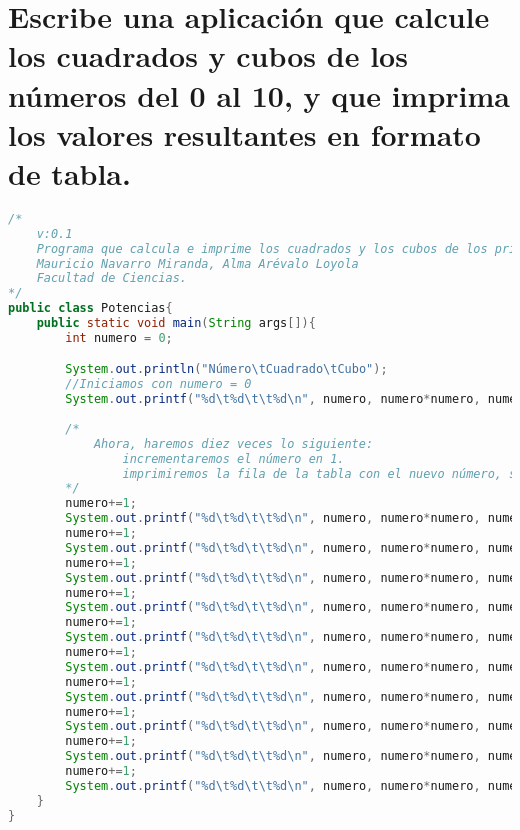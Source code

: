 \documentclass[a4paper]{article}
\begin{document}
\section{Escribe una aplicación que calcule los cuadrados y cubos de los números del 0 al 10, y que imprima los valores resultantes en formato de tabla.}
\begin{lstlisting}[language=JAVA]
/*
    v:0.1
    Programa que calcula e imprime los cuadrados y los cubos de los primeros once naturales.
    Mauricio Navarro Miranda, Alma Arévalo Loyola
    Facultad de Ciencias.
*/
public class Potencias{
    public static void main(String args[]){
        int numero = 0;

        System.out.println("Número\tCuadrado\tCubo");
        //Iniciamos con numero = 0
        System.out.printf("%d\t%d\t\t%d\n", numero, numero*numero, numero*numero*numero);
        
        /*
            Ahora, haremos diez veces lo siguiente:
                incrementaremos el número en 1.
                imprimiremos la fila de la tabla con el nuevo número, su cuadrado y su cubo.
        */
        numero+=1;
        System.out.printf("%d\t%d\t\t%d\n", numero, numero*numero, numero*numero*numero);
        numero+=1;
        System.out.printf("%d\t%d\t\t%d\n", numero, numero*numero, numero*numero*numero);
        numero+=1;
        System.out.printf("%d\t%d\t\t%d\n", numero, numero*numero, numero*numero*numero);
        numero+=1;
        System.out.printf("%d\t%d\t\t%d\n", numero, numero*numero, numero*numero*numero);
        numero+=1;
        System.out.printf("%d\t%d\t\t%d\n", numero, numero*numero, numero*numero*numero);
        numero+=1;
        System.out.printf("%d\t%d\t\t%d\n", numero, numero*numero, numero*numero*numero);
        numero+=1;
        System.out.printf("%d\t%d\t\t%d\n", numero, numero*numero, numero*numero*numero);
        numero+=1;
        System.out.printf("%d\t%d\t\t%d\n", numero, numero*numero, numero*numero*numero);
        numero+=1;
        System.out.printf("%d\t%d\t\t%d\n", numero, numero*numero, numero*numero*numero);
        numero+=1;
        System.out.printf("%d\t%d\t\t%d\n", numero, numero*numero, numero*numero*numero);
    }
}
\end{lstlisting}
\end{document}
